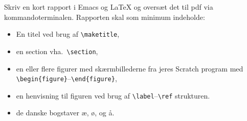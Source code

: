 Skriv en kort rapport i Emacs og LaTeX og oversæt det til pdf via kommandoterminalen. Rapporten skal som minimum indeholde:
  \begin{itemize}
  \item En titel ved brug af \verb|\maketitle|, 
  \item en section vha.\ \verb|\section|,
  \item en eller flere figurer med skærmbillederne fra jeres Scratch program med \verb|\begin{figure}|--\verb|\end{figure}|,
  \item en henvisning til figuren ved brug af \verb|\label|--\verb|\ref| strukturen.
  \item de danske bogstaver æ, ø, og å.
  \end{itemize}
